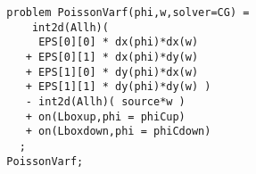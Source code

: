 \begin{lstlisting}
  problem PoissonVarf(phi,w,solver=CG) =
      int2d(Allh)(
   	   EPS[0][0] * dx(phi)*dx(w)
   	 + EPS[0][1] * dx(phi)*dy(w)
   	 + EPS[1][0] * dy(phi)*dx(w)
   	 + EPS[1][1] * dy(phi)*dy(w) )
   	 - int2d(Allh)( source*w )
   	 + on(Lboxup,phi = phiCup)
   	 + on(Lboxdown,phi = phiCdown)
    ;
  PoissonVarf;
  \end{lstlisting}

